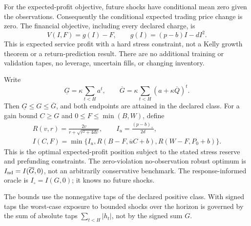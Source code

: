 For the expected-profit objective, future shocks have conditional mean zero
given the observations. Consequently the conditional expected trading price
change is zero. The financial objective, including every declared charge, is
\[
 V(I,F)=g(I)-F,\qquad g(I)=(p-b)I-dI^2.
\]
This is expected service profit with a hard stress constraint, not a Kelly
growth theorem or a return-prediction result. There are no additional training
or validation tapes, no leverage, uncertain fills, or changing inventory.

\begin{lemma}\label{fhc:capacity}
Write
\[
 \underline G=\kappa\sum_{t<H}a^t,\qquad
 \overline G=\kappa\sum_{t<H}(a+\kappa\overline Q)^t.
\]
Then $\underline G\le G\le\overline G$, and both endpoints are attained
in the declared class. For a gain bound $C\ge G$ and
$0\le F\le\min(B,W)$, define
\[
 \begin{gathered}
 R(v,r)=\frac{2v}{r+\sqrt{r^2+4dv}},\qquad I_u=\frac{(p-b)_+}{2d},\\
 I(C,F)=\min\{I_u,R(B-F,\overline u C+b),R(W-F,P_0+b)\}.
 \end{gathered}
\]
This is the optimal expected-profit position subject to the stated stress
reserve and prefunding constraints. The zero-violation no-observation robust optimum is
$I_{\rm nd}=I(\overline G,0)$, not an arbitrarily conservative benchmark.
The response-informed oracle is $I_\circ=I(G,0)$; it knows no future shocks.
\end{lemma}
The bounds use the nonnegative taps of the declared positive class. With signed taps the worst-case exposure to bounded shocks over the horizon is governed by the sum of absolute taps $\sum_{t<H}|h_t|$, not by the signed sum $G$.

